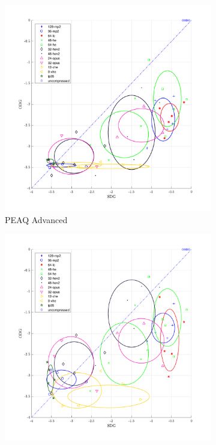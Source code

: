 \begin{figure}[h!]
    \centering
    \begin{subfigure}{.5\textwidth}
        \centering
        \includegraphics[width=1\linewidth]{pic/compareAdvanced.pdf}
        \caption{PEAQ Advanced}
        \label{fig:compare:advanced}
    \end{subfigure}%
    \begin{subfigure}{.5\textwidth}
        \centering
        \includegraphics[width=1\linewidth]{pic/compareBasic.pdf}

\end{subfigure}
\end{figure}
